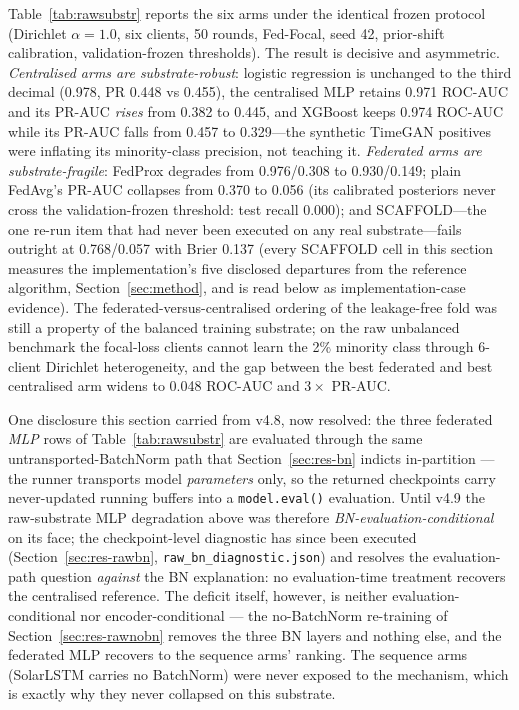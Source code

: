 Table~\ref{tab:rawsubstr} reports the six arms under the identical
frozen protocol (Dirichlet $\alpha{=}1.0$, six clients, 50 rounds,
Fed-Focal, seed 42, prior-shift calibration, validation-frozen
thresholds). The result is decisive and asymmetric.
\emph{Centralised arms are substrate-robust}: logistic regression is
unchanged to the third decimal (0.978, PR 0.448 vs 0.455), the
centralised MLP retains 0.971 ROC-AUC and its PR-AUC \emph{rises}
from 0.382 to 0.445, and XGBoost keeps 0.974 ROC-AUC while its
PR-AUC falls from 0.457 to 0.329---the synthetic TimeGAN positives
were inflating its minority-class precision, not teaching it.
\emph{Federated arms are substrate-fragile}: FedProx degrades from
0.976/0.308 to 0.930/0.149; plain FedAvg's PR-AUC collapses from
0.370 to 0.056 (its calibrated posteriors never cross the
validation-frozen threshold: test recall 0.000); and SCAFFOLD---the
one re-run item that had never been executed on any real
substrate---fails outright at 0.768/0.057 with Brier 0.137 (every
SCAFFOLD cell in this section measures the implementation's five
disclosed departures from the reference algorithm,
Section~\ref{sec:method}, and is read below as implementation-case
evidence). The
federated-versus-centralised ordering of the leakage-free fold was
still a property of the balanced training substrate; on the raw
unbalanced benchmark the focal-loss clients cannot learn the 2\%
minority class through 6-client Dirichlet heterogeneity, and the
gap between the best federated and best centralised arm widens to
0.048 ROC-AUC and $3\times$ PR-AUC.

One disclosure this section carried from v4.8, now resolved: the
three federated \emph{MLP} rows of Table~\ref{tab:rawsubstr} are
evaluated through the same untransported-BatchNorm path that
Section~\ref{sec:res-bn} indicts in-partition --- the runner
transports model \emph{parameters} only, so the returned
checkpoints carry never-updated running buffers into a
\texttt{model.eval()} evaluation. Until v4.9 the raw-substrate MLP
degradation above was therefore \emph{BN-evaluation-conditional} on
its face; the checkpoint-level diagnostic has since been executed
(Section~\ref{sec:res-rawbn}, \texttt{raw\_bn\_diagnostic.json}) and
resolves the evaluation-path question \emph{against} the BN
explanation: no evaluation-time treatment recovers the centralised
reference. The deficit itself, however, is neither
evaluation-conditional nor encoder-conditional --- the
no-BatchNorm re-training of Section~\ref{sec:res-rawnobn} removes the
three BN layers and nothing else, and the federated MLP recovers to
the sequence arms' ranking. The sequence arms (SolarLSTM carries no
BatchNorm) were never exposed to the mechanism, which is exactly why
they never collapsed on this substrate.

